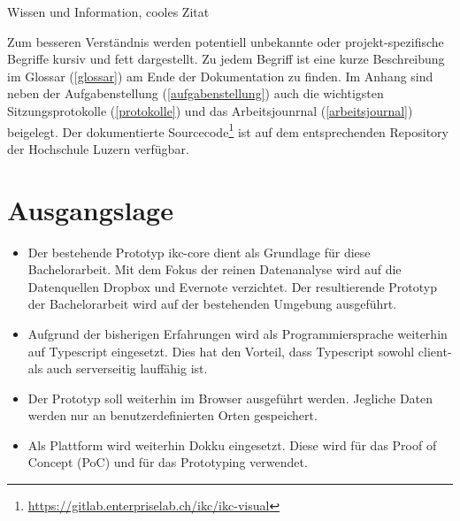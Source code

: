 Wissen und Information, cooles Zitat


Zum besseren Verständnis werden potentiell unbekannte oder projekt-spezifische Begriffe kursiv und fett dargestellt. Zu jedem Begriff ist eine kurze Beschreibung im Glossar (\autoref{glossar}) am Ende der Dokumentation zu finden. Im Anhang sind neben der Aufgabenstellung (\autoref{aufgabenstellung}) auch die wichtigsten Sitzungsprotokolle (\autoref{protokolle}) und das Arbeitsjounrnal (\autoref{arbeitsjournal}) beigelegt. Der dokumentierte Sourcecode\footnote{\url{https://gitlab.enterpriselab.ch/ikc/ikc-visual}} ist auf dem entsprechenden Repository der Hochschule Luzern verfügbar.


\section{Ausgangslage}

\begin{itemize}
    \item Der bestehende Prototyp \gls{ikc-core} dient als Grundlage für diese Bachelorarbeit. Mit dem Fokus der reinen Datenanalyse wird auf die Datenquellen Dropbox und Evernote verzichtet. Der resultierende Prototyp der Bachelorarbeit wird auf der bestehenden Umgebung ausgeführt.
    \item Aufgrund der bisherigen Erfahrungen wird als Programmiersprache weiterhin auf Typescript eingesetzt. Dies hat den Vorteil, dass Typescript sowohl client- als auch serverseitig lauffähig ist.
    \item Der Prototyp soll weiterhin im Browser ausgeführt werden. Jegliche Daten werden nur an benutzerdefinierten Orten gespeichert.
    \item Als Plattform wird weiterhin \gls{Dokku} eingesetzt. Diese wird für das Proof of Concept (\gls{PoC}) und für das Prototyping verwendet.
\end{itemize}

